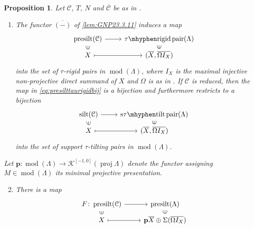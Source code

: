 \documentclass[10pt,twoside, a4paper,reqno]{amsart}
\DeclareMathOperator{\mods}{mod}
\newcommand{\stautiltpair}{\mathrm{s\tau\mhyphen tilt{\,}pair}}
\newcommand{\taurigidpair}{\mathrm{\tau\mhyphen rigid{\,}pair}}
\DeclareMathOperator{\silt}{silt}
\DeclareMathOperator{\presilt}{presilt}
\DeclareMathOperator{\proj}{proj}
\newcommand{\Ktwo}{\mathcal{K}^{[-1,0]}}
\newcommand{\calC}{\mathcal{C}}
\newtheorem{proposition}[theorem]{Proposition}
\theoremstyle{definition}
\begin{document}
\begin{proposition}\label{prop:F}
Let $\calC$, $T$, $N$ and $\overline{\calC}$ be as in .
\begin{enumerate}
    \item\label{prop:PZ24.4.5} The functor $\overline{(-)}$ of \cref{lem:GNP23.3.11} induces a map
    \begin{equation}\label{eq:presilttaurigidbij}
    \begin{tikzcd}[row sep=0.5em]
        \presilt(\calC) \arrow[r] & \taurigidpair(\Lambda) \\
        X \arrow[r,mapsto] \arrow[u,phantom, sloped, "\in"] & (\overline{X},\overline{\Omega I_X})\arrow[u,phantom, sloped, "\in"] 
    \end{tikzcd}
    \end{equation}
    into the set of $\tau$-rigid pairs in $\mods(\Lambda)$, where $I_X$ is the maximal injective non-projective direct summand of $X$ and $\Omega$ is as in . If $\calC$ is reduced, then the map in \eqref{eq:presilttaurigidbij} is a bijection and furthermore restricts to a bijection
    \begin{equation*}
    \begin{tikzcd}[row sep=0.5em]
        \silt(\calC) \arrow[r] & \stautiltpair(\Lambda) \\
        X \arrow[r,mapsto] \arrow[u,phantom, sloped, "\in"] & (\overline{X},\overline{\Omega I_X})\arrow[u,phantom, sloped, "\in"] 
    \end{tikzcd}
    \end{equation*}
    into the set of support $\tau$-tilting pairs in $\mods(\Lambda)$. 
\end{enumerate}
    Let $\mathbf{p}\colon \mods(\Lambda) \to \Ktwo(\proj \Lambda)$ denote the functor assigning $M\in \mods(\Lambda)$ its minimal projective presentation.
    \begin{enumerate}
    \setcounter{enumi}{1}
        \item\label{thm:modulecatreduction_presilt} 
    There is a map
    \begin{equation}\label{eq:presilttaurigidbijF}
    \begin{tikzcd}[row sep=0.5em]
        F \colon \presilt(\calC) \arrow[r] & \presilt (\Lambda)  \\
        X \arrow[r,mapsto] \arrow[u,phantom, sloped, "\in"] & \mathbf{p}\overline{X} \oplus \Sigma (\overline{\Omega I_X}) \arrow[u,phantom, sloped, "\in"] 
    \end{tikzcd}

\end{equation}
\end{enumerate}
\end{proposition}
\end{document}
